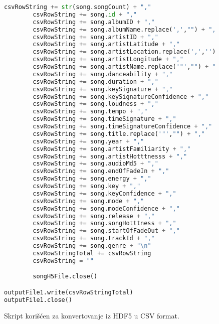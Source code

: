 \begin{figure}
\begin{lstlisting}[language=Python, basicstyle=\footnotesize]
        csvRowString += str(song.songCount) + ","
        csvRowString += song.id + ","
        csvRowString += song.albumID + ","
        csvRowString += song.albumName.replace(',',"") + ","
        csvRowString += song.artistID + ","
        csvRowString += song.artistLatitude + ","
        csvRowString += song.artistLocation.replace(',','') + ","
        csvRowString += song.artistLongitude + ","
        csvRowString += song.artistName.replace('"',"") + ","
        csvRowString += song.danceability + ","
        csvRowString += song.duration + ","
        csvRowString += song.keySignature + ","
        csvRowString += song.keySignatureConfidence + ","
        csvRowString += song.loudness + ","
        csvRowString += song.tempo + ","
        csvRowString += song.timeSignature + ","
        csvRowString += song.timeSignatureConfidence + ","
        csvRowString += song.title.replace('"',"") + ","
        csvRowString += song.year + ","
        csvRowString += song.artistFamiliarity + ","
        csvRowString += song.artistHotttnesss + ","
        csvRowString += song.audioMd5 + ","
        csvRowString += song.endOfFadeIn + ","
        csvRowString += song.energy + ","
        csvRowString += song.key + ","
        csvRowString += song.keyConfidence + ","
        csvRowString += song.mode + ","
        csvRowString += song.modeConfidence + ","
        csvRowString += song.release + ","
        csvRowString += song.songHotttness + ","
        csvRowString += song.startOfFadeOut + ","
        csvRowString += song.trackId + ","
        csvRowString += song.genre + "\n"
        csvRowStringTotal += csvRowString
        csvRowString = ""

        songH5File.close()

outputFile1.write(csvRowStringTotal)
outputFile1.close()
\end{lstlisting}
\label{code:ConvertToCSV}
\caption{Skript kori\v{s}\'c{}en za konvertovanje iz HDF5 u CSV format.}
\end{figure}
